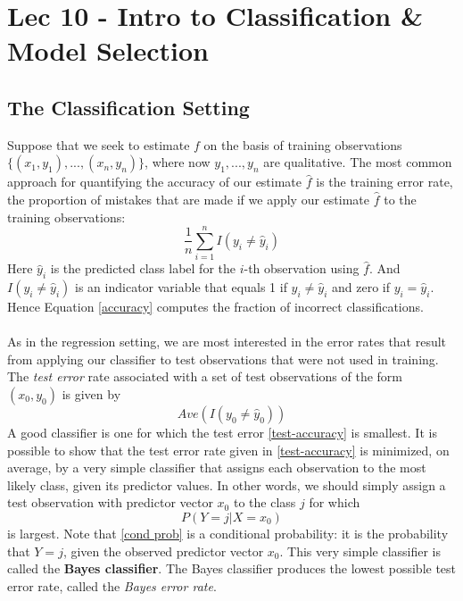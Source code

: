 \chapter{Lec 10 - Intro to Classification \& Model Selection}

\maketitle

\section{The Classification Setting}
Suppose that we seek to estimate $f$ on the basis of training observations $\{(x_1, y_1), ..., (x_n, y_n)\}$, where now $y_1,...,y_n$ are qualitative. The most common approach for quantifying the accuracy of our estimate $\hat{f}$ is the training error rate, the proportion of mistakes that are made if we apply our estimate $\hat{f}$ to the training observations:
\begin{equation}
    \frac{1}{n} \sum_{i=1}^n I(y_i \neq \hat{y}_i)
    \label{accuracy}
\end{equation}
Here $\hat{y}_i$ is the predicted class label for the $i$-th observation using $\hat{f}$. And $I(y_i \neq \hat{y}_i)$ is an indicator variable that equals 1 if $y_i \neq \hat{y}_i$ and zero if $y_i = \hat{y}_i$. Hence Equation \ref{accuracy} computes the fraction of incorrect classifications.\\\\
As in the regression setting, we are most interested in the error rates that result from applying our classifier to test observations that were not used in training. The \textit{test error} rate associated with a set of test observations of the form $(x_0, y_0)$ is given by
\begin{equation}
    Ave(I(y_0 \neq \hat{y}_0))
    \label{test-accuracy}
\end{equation}
A good classifier is one for which the test error \ref{test-accuracy} is smallest. It is possible to show that the test error rate given in \ref{test-accuracy} is minimized, on average, by a very simple classifier that assigns each observation to the most likely class, given its predictor values.  In other words, we should simply assign a test observation with predictor vector $x_0$ to the class $j$ for which
\begin{equation}
    P(Y=j | X=x_0)
    \label{cond prob}
\end{equation}
is largest. Note that \ref{cond prob} is a conditional probability: it is the probability that $Y = j$, given the observed predictor vector $x_0$. This very simple classifier is called the \textbf{Bayes classifier}. The Bayes classifier produces the lowest possible test error rate, called the \textit{Bayes error rate}.
